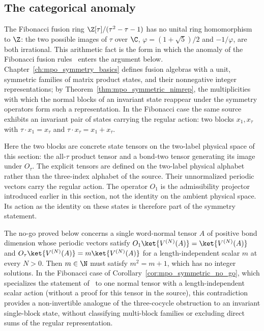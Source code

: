 
\subsection{The categorical anomaly}%
\label{sec:asymex_fib_anomaly}

The Fibonacci fusion ring $\Z[\tau]/(\tau^2-\tau-1)$ has no unital ring
homomorphism to $\Z$: the two possible images of $\tau$ over $\C$,
$\varphi=(1+\sqrt5)/2$ and $-1/\varphi$, are both irrational. This
arithmetic fact is the form in which the anomaly of the Fibonacci
fusion rules~\cite[Section~III.A.6]{Cirac2021Matrix} enters the
argument below. Chapter~\ref{ch:mpo_symmetry_basics} defines fusion algebras with a
unit, symmetric families of matrix product states, and their
nonnegative integer representations; by
Theorem~\ref{thm:mpo_symmetric_nimrep}, the multiplicities with which the
normal blocks of an invariant state reappear under the symmetry
operators form such a representation. In the
Fibonacci case the same source exhibits an invariant pair of states
carrying the regular action: two blocks $x_1,x_\tau$ with
$\tau\cdot x_1=x_\tau$ and $\tau\cdot x_\tau=x_1+x_\tau$.

Here the two blocks are concrete state tensors on the two-label
physical space of this section: the all-$\tau$ product tensor and a
bond-two tensor generating its image under $O_\tau$. The explicit
tensors are defined on the two-label physical alphabet rather than the
three-index alphabet of the source. Their unnormalized periodic
vectors carry the regular action. The operator $O_1$ is the
admissibility projector introduced earlier in this section, not the
identity on the ambient physical space. Its action as the identity on
these states is therefore part of the symmetry statement.

The no-go proved below concerns a single word-normal tensor $A$ of positive
bond dimension whose periodic vectors satisfy
$O_1\ket{V^{(N)}(A)}=\ket{V^{(N)}(A)}$ and
$O_\tau\ket{V^{(N)}(A)}=m\ket{V^{(N)}(A)}$ for a length-independent scalar
$m$ at every $N>0$. Then $m\in\N$ must satisfy $m^2=m+1$, which has no integer
solutions. In the Fibonacci case of
Corollary~\ref{cor:mpo_symmetric_no_go}, which specializes the statement
of~\cite{GarreRubio2023MPOSym} to one normal tensor with a
length-independent scalar action (without a proof for this tensor in the
source), this contradiction provides a non-invertible analogue of the
three-cocycle obstruction to an invariant single-block state, without
classifying multi-block families or excluding direct sums of the regular
representation.

